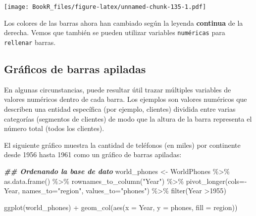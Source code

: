\documentclass[
]{book}
\newenvironment{Shaded}{\begin{snugshade}}{\end{snugshade}}
\newcommand{\AttributeTok}[1]{\textcolor[rgb]{0.77,0.63,0.00}{#1}}
\newcommand{\DecValTok}[1]{\textcolor[rgb]{0.00,0.00,0.81}{#1}}
\newcommand{\DocumentationTok}[1]{\textcolor[rgb]{0.56,0.35,0.01}{\textbf{\textit{#1}}}}
\newcommand{\FunctionTok}[1]{\textcolor[rgb]{0.00,0.00,0.00}{#1}}
\newcommand{\NormalTok}[1]{#1}
\newcommand{\OtherTok}[1]{\textcolor[rgb]{0.56,0.35,0.01}{#1}}
\newcommand{\SpecialCharTok}[1]{\textcolor[rgb]{0.00,0.00,0.00}{#1}}
\newcommand{\StringTok}[1]{\textcolor[rgb]{0.31,0.60,0.02}{#1}}
\begin{document}
\texttt{[image: BookR\_files/figure-latex/unnamed-chunk-135-1.pdf]}

Los colores de las barras ahora han cambiado según la leyenda \textbf{continua} de la derecha. Vemos que también se pueden utilizar variables \texttt{numéricas} para \texttt{rellenar} barras.

\hypertarget{gruxe1ficos-de-barras-apiladas}{%
\subsection{Gráficos de barras apiladas}\label{gruxe1ficos-de-barras-apiladas}}

En algunas circunstancias, puede resultar útil trazar múltiples variables de valores numéricos dentro de cada barra. Los ejemplos son valores numéricos que describen una entidad específica (por ejemplo, clientes) dividida entre varias categorías (segmentos de clientes) de modo que la altura de la barra representa el número total (todos los clientes).

El siguiente gráfico muestra la cantidad de teléfonos (en miles) por continente desde 1956 hasta 1961 como un gráfico de barras apiladas:

\begin{Shaded}
\begin{Highlighting}[]
\DocumentationTok{\#\# Ordenando la base de dato}
\NormalTok{world\_phones }\OtherTok{\textless{}{-}}\NormalTok{ WorldPhones }\SpecialCharTok{\%\textgreater{}\%}
  \FunctionTok{as.data.frame}\NormalTok{() }\SpecialCharTok{\%\textgreater{}\%}
  \FunctionTok{rownames\_to\_column}\NormalTok{(}\StringTok{"Year"}\NormalTok{) }\SpecialCharTok{\%\textgreater{}\%}
  \FunctionTok{pivot\_longer}\NormalTok{(}\AttributeTok{cols=}\SpecialCharTok{{-}}\NormalTok{Year, }\AttributeTok{names\_to=}\StringTok{"region"}\NormalTok{, }\AttributeTok{values\_to=}\StringTok{"phones"}\NormalTok{) }\SpecialCharTok{\%\textgreater{}\%}
  \FunctionTok{filter}\NormalTok{(Year }\SpecialCharTok{\textgreater{}}\DecValTok{1955}\NormalTok{)}
\end{Highlighting}
\end{Shaded}

\begin{Shaded}
\begin{Highlighting}[]
\FunctionTok{ggplot}\NormalTok{(world\_phones) }\SpecialCharTok{+} 
  \FunctionTok{geom\_col}\NormalTok{(}\FunctionTok{aes}\NormalTok{(}\AttributeTok{x =}\NormalTok{ Year, }\AttributeTok{y =}\NormalTok{ phones,}
               \AttributeTok{fill =}\NormalTok{ region))}
\end{Highlighting}
\end{Shaded}
\end{document}
